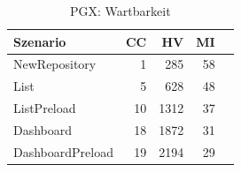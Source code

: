 \begin{table}[ht]
\centering
\caption{PGX: Wartbarkeit}
\begin{tabular}{lrrrr}
\toprule
Szenario & CC & HV & MI \\
\midrule
	NewRepository & 1 & 285 & 58 \\
	List & 5 & 628 & 48 \\
	ListPreload & 10 & 1312 & 37 \\
	Dashboard & 18 & 1872 & 31 \\
	DashboardPreload & 19 & 2194 & 29 \\
\bottomrule
\end{tabular}
\label{tab:pgx_maintainability}
\end{table}
	